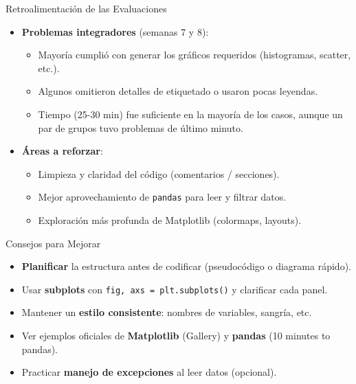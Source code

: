 \documentclass[10pt]{beamer}
\begin{document}
\begin{frame}{Retroalimentación de las Evaluaciones}
  \begin{itemize}
    \item \textbf{Problemas integradores} (semanas 7 y 8):
      \begin{itemize}
        \item Mayoría cumplió con generar los gráficos requeridos (histogramas, scatter, etc.).
        \item Algunos omitieron detalles de etiquetado o usaron pocas leyendas.
        \item Tiempo (25-30 min) fue suficiente en la mayoría de los casos, aunque un par de grupos tuvo problemas de último minuto.
      \end{itemize}
    \item \textbf{Áreas a reforzar}:
      \begin{itemize}
        \item Limpieza y claridad del código (comentarios / secciones).
        \item Mejor aprovechamiento de \texttt{pandas} para leer y filtrar datos.
        \item Exploración más profunda de Matplotlib (colormaps, layouts).
      \end{itemize}
  \end{itemize}
\end{frame}

\begin{frame}{Consejos para Mejorar}
  \begin{itemize}
    \item \textbf{Planificar} la estructura antes de codificar (pseudocódigo o diagrama rápido).
    \item Usar \textbf{subplots} con \texttt{fig, axs = plt.subplots()} y clarificar cada panel.
    \item Mantener un \textbf{estilo consistente}: nombres de variables, sangría, etc.
    \item Ver ejemplos oficiales de \textbf{Matplotlib} (Gallery) y \textbf{pandas} (10 minutes to pandas).
    \item Practicar \textbf{manejo de excepciones} al leer datos (opcional).
  \end{itemize}
\end{frame}
\end{document}
